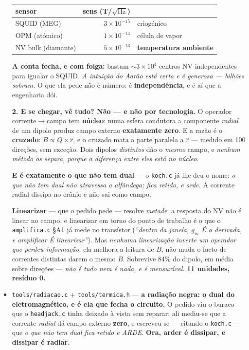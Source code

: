\documentclass[11pt]{article}
\newcommand{\code}[1]{\texttt{\small #1}}
\theoremstyle{plain}
\theoremstyle{remark}
\begin{document}
\begin{itemize}
\begin{center}
\begin{tabular}{lrl}
\toprule
sensor & sens (T/$\sqrt{\text{Hz}}$) & \\
\midrule
SQUID (MEG) & $3\times10^{-15}$ & criogénico \\
OPM (atómico) & $1\times10^{-14}$ & célula de vapor \\
NV bulk (diamante) & $5\times10^{-13}$ & \textbf{temperatura ambiente} \\
\bottomrule
\end{tabular}
\end{center}

\textbf{A conta fecha, e com folga:} bastam $\sim\!3\times10^{4}$ centros NV independentes para
igualar o SQUID. \emph{A intuição do Aarão está certa e é generosa --- bilhões sobram.} O que ela
pede não é número: é \textbf{independência}, e é aí que a engenharia dói.

\textbf{2. E se chegar, vê tudo? Não --- e não por tecnologia.} O operador corrente$\to$campo tem
\textbf{núcleo}: numa esfera condutora a componente \emph{radial} de um dipolo produz campo externo
\textbf{exatamente zero}. E a razão é o \textbf{cruzado}: $B \propto Q\times\hat{r}$, e o cruzado
mata a parte paralela a $\hat r$ --- medido em 100 direções, sem exceção. Dois dipolos
\emph{distintos} dão o \emph{mesmo} campo, e \emph{nenhum método os separa, porque a diferença entre
eles está no núcleo}.

\textbf{E é exatamente o que não tem dual} --- o \code{koch.c} já lhe deu o nome: \emph{o que não
tem dual não atravessa a alfândega; fica retido, e arde.} A corrente radial dissipa no crânio e não
sai como campo.

\textbf{Linearizar} --- que o pedido pede --- resolve \emph{metade}: a resposta do NV não é linear no
campo, e linearizar em torno do ponto de trabalho é o que o \code{amplifica.c} §A1 já mede no
transístor (\emph{``dentro da janela, $g_m$ É a derivada, e amplificar É linearizar''}). Mas
\emph{nenhuma linearização inverte um operador que perdeu informação}: ela melhora a leitura de $B$,
não muda o facto de correntes distintas darem o mesmo $B$. Sobrevive $84\%$ do dipolo, em média
sobre direções --- \emph{não é tudo nem é nada, e é mensurável.} \textbf{11 unidades, resíduo 0.}


\item \code{tools/radiacao.c} + \code{tools/termica.h} --- \textbf{a radiação negra: o dual do
eletromagnético, e é ela que fecha o circuito.} O pedido viu o buraco que o \code{headjack.c} tinha
deixado à vista sem reparar: ali mediu-se que a corrente \emph{radial} dá campo externo
\textbf{zero}, e escreveu-se --- citando o \code{koch.c} --- que \emph{o que não tem dual fica
retido e ARDE}. \textbf{Ora, arder é dissipar, e dissipar é radiar.}


\end{itemize}
\end{document}
